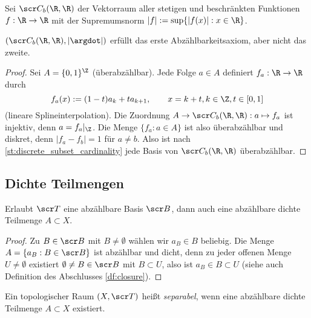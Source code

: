 \begin{st}
	Sei $\scr C_b(\R, \R)$ der Vektorraum aller stetigen und beschränkten Funktionen $f: \R \to \R$ mit der Supremumsnorm $|f| := \sup \{|f(x)| : x \in \R \}$.

	$(\scr C_b(\R,\R),|\argdot|)$ erfüllt das erste Abzählbarkeitsaxiom, aber nicht das zweite.
	\begin{proof}
		Sei $A = \{0, 1\}^\Z$ (überabzählbar).
		Jede Folge $a \in A$ definiert $f_a : \R \to \R$ durch
		\[
			f_a(x)
			:= (1-t)a_k + t a_{k+1},
			\qquad x = k+t, k \in \Z, t \in [0,1]
		\]
		(lineare Splineinterpolation).
		Die Zuordnung $A \to \scr C_b (\R, \R) : a \mapsto f_a$ ist injektiv, denn $a = f_a|_\Z$.
		Die Menge $\{f_a : a \in A\}$ ist also überabzählbar und diskret, denn $|f_a - f_b| = 1$ für $a\neq b$.
		Also ist nach \ref{st:discrete_subset_cardinality} jede Basis von $\scr C_b (\R, \R)$ überabzählbar.
	\end{proof}
\end{st}

\subsection{Dichte Teilmengen}

\begin{st} \label{st:countable_base_countable_dense_subset}
	Erlaubt $\scr T$ eine abzählbare Basis $\scr B$, dann auch eine abzählbare dichte Teilmenge $A \subset X$.
	\begin{proof}
		Zu $B \in \scr B$ mit $B \neq \emptyset$ wählen wir $a_B \in B$ beliebig.
		Die Menge $A = \{a_B : B \in \scr B\}$ ist abzählbar und dicht, denn zu jeder offenen Menge $U \neq \emptyset$ existiert $\emptyset \neq B \in \scr B$ mit $B \subset U$, also ist $a_B \in B \subset U$ (siehe auch Definition des Abschlusses \ref{df:closure}).
	\end{proof}
\end{st}

\begin{df}
	Ein topologischer Raum $(X, \scr T)$ heißt \emph{separabel}, wenn eine abzählbare dichte Teilmenge $A \subset X$ existiert.
\end{df}

